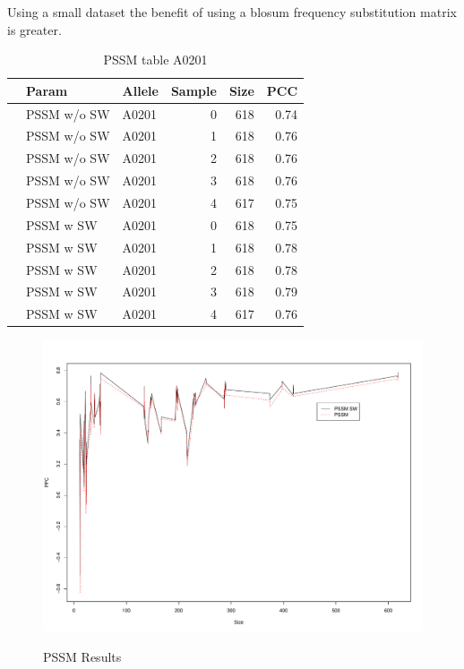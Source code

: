 Using a small dataset the benefit of using a blosum frequency substitution matrix is greater.

\begin{table}[ht]
\begin{center}
\begin{tabular}{rllrrr}
  \hline
 & Param & Allele & Sample & Size & PCC \\ 
  \hline
 & PSSM w/o SW & A0201 &   0 & 618 & 0.74 \\ 
 & PSSM w/o SW & A0201 &   1 & 618 & 0.76 \\ 
 & PSSM w/o SW & A0201 &   2 & 618 & 0.76 \\ 
 & PSSM w/o SW & A0201 &   3 & 618 & 0.76 \\ 
 & PSSM w/o SW & A0201 &   4 & 617 & 0.75 \\ 
\hline
 & PSSM w SW & A0201 &   0 & 618 & 0.75 \\ 
 & PSSM w SW & A0201 &   1 & 618 & 0.78 \\ 
 & PSSM w SW & A0201 &   2 & 618 & 0.78 \\ 
 & PSSM w SW & A0201 &   3 & 618 & 0.79 \\ 
 & PSSM w SW & A0201 &   4 & 617 & 0.76 \\ 
   \hline
\end{tabular}
\end{center}
\label{tab:pssm1}
\caption{PSSM table A0201}
\end{table}

\begin{figure}
\begin{center}
\includegraphics[width=12cm]{fig/pssm1.pdf}
\label{fig:pssm1}
\caption{PSSM Results}
\end{center}
\end{figure}

